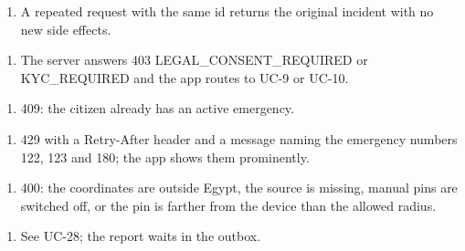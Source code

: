 \begin{enumerate}[nosep,leftmargin=*,label=\textcolor{najdablue}{\bfseries\arabic*.}]
\item A repeated request with the same id returns the original incident with no new side effects.
\end{enumerate}
\begin{enumerate}[nosep,leftmargin=*,label=\textcolor{najdablue}{\bfseries\arabic*.}]
\item The server answers 403 LEGAL\_\allowbreak{}CONSENT\_\allowbreak{}REQUIRED or KYC\_\allowbreak{}REQUIRED and the app routes to UC-9 or UC-10.
\end{enumerate}
\begin{enumerate}[nosep,leftmargin=*,label=\textcolor{najdablue}{\bfseries\arabic*.}]
\item 409: the citizen already has an active emergency.
\end{enumerate}
\begin{enumerate}[nosep,leftmargin=*,label=\textcolor{najdablue}{\bfseries\arabic*.}]
\item 429 with a Retry-After header and a message naming the emergency numbers 122, 123 and 180; the app shows them prominently.
\end{enumerate}
\begin{enumerate}[nosep,leftmargin=*,label=\textcolor{najdablue}{\bfseries\arabic*.}]
\item 400: the coordinates are outside Egypt, the source is missing, manual pins are switched off, or the pin is farther from the device than the allowed radius.
\end{enumerate}
\begin{enumerate}[nosep,leftmargin=*,label=\textcolor{najdablue}{\bfseries\arabic*.}]
\item See UC-28; the report waits in the outbox.
\end{enumerate}

